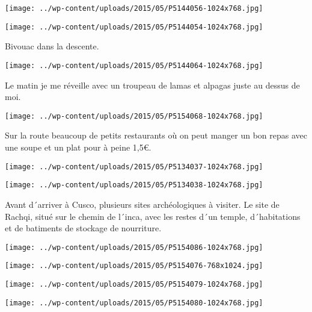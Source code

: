 \centerline{\texttt{[image: ../wp-content/uploads/2015/05/P5144056-1024x768.jpg]} } 
 \newline
 \newline
\centerline{\texttt{[image: ../wp-content/uploads/2015/05/P5144054-1024x768.jpg]} } 
 \newline
 Bivouac dans la descente. \newline
 \newline
\centerline{\texttt{[image: ../wp-content/uploads/2015/05/P5144064-1024x768.jpg]} } 
 \newline
 Le matin je me réveille avec un troupeau de lamas et alpagas juste au dessus de moi. \newline
 \newline
\centerline{\texttt{[image: ../wp-content/uploads/2015/05/P5154068-1024x768.jpg]} } 
 \newline
 Sur la route beaucoup de petits restaurants où on peut manger un bon repas avec une soupe et un plat pour à peine 1,5€. \newline
 \newline
\centerline{\texttt{[image: ../wp-content/uploads/2015/05/P5134037-1024x768.jpg]} } 
 \newline
 \newline
\centerline{\texttt{[image: ../wp-content/uploads/2015/05/P5134038-1024x768.jpg]} } 
 \newline
 Avant d´arriver à Cusco, plusieurs sites archéologiques à visiter. \newline
 Le site de Rachqi, situé sur le chemin de l´inca, avec les restes d´un temple, d´habitations et de batiments de stockage de nourriture. \newline
 \newline
\centerline{\texttt{[image: ../wp-content/uploads/2015/05/P5154086-1024x768.jpg]} } 
 \newline
 \newline
\centerline{\texttt{[image: ../wp-content/uploads/2015/05/P5154076-768x1024.jpg]} } 
 \newline
 \newline
\centerline{\texttt{[image: ../wp-content/uploads/2015/05/P5154079-1024x768.jpg]} } 
 \newline
 \newline
\centerline{\texttt{[image: ../wp-content/uploads/2015/05/P5154080-1024x768.jpg]} } 
 \newline
